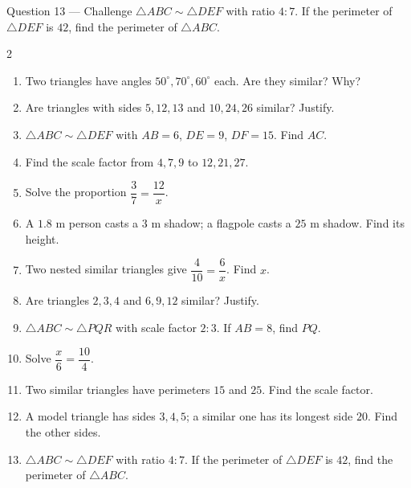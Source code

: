 \documentclass[11pt]{article}
\begin{document}
\begin{qbox}{Question 13 --- Challenge}
$\triangle ABC\sim\triangle DEF$ with ratio $4:7$. If the perimeter of $\triangle DEF$ is $42$, find the perimeter of $\triangle ABC$.\workspace{2.8cm}
\end{qbox}

\clearpage
{}

\begin{recapbox}
\begin{multicols}{2}
\small
\begin{enumerate}[leftmargin=*,itemsep=3pt]
  \item Two triangles have angles $50^\circ,70^\circ,60^\circ$ each. Are they similar? Why?
  \item Are triangles with sides $5,12,13$ and $10,24,26$ similar? Justify.
  \item $\triangle ABC\sim\triangle DEF$ with $AB=6$, $DE=9$, $DF=15$. Find $AC$.
  \item Find the scale factor from $4,7,9$ to $12,21,27$.
  \item Solve the proportion $\dfrac{3}{7}=\dfrac{12}{x}$.
  \item A $1.8$ m person casts a $3$ m shadow; a flagpole casts a $25$ m shadow. Find its height.
  \item Two nested similar triangles give $\dfrac{4}{10}=\dfrac{6}{x}$. Find $x$.
  \item Are triangles $2,3,4$ and $6,9,12$ similar? Justify.
  \item $\triangle ABC\sim\triangle PQR$ with scale factor $2:3$. If $AB=8$, find $PQ$.
  \item Solve $\dfrac{x}{6}=\dfrac{10}{4}$.
  \item Two similar triangles have perimeters $15$ and $25$. Find the scale factor.
  \item A model triangle has sides $3,4,5$; a similar one has its longest side $20$. Find the other sides.
  \item $\triangle ABC\sim\triangle DEF$ with ratio $4:7$. If the perimeter of $\triangle DEF$ is $42$, find the perimeter of $\triangle ABC$.
\end{enumerate}
\end{multicols}
\end{recapbox}
\end{document}
